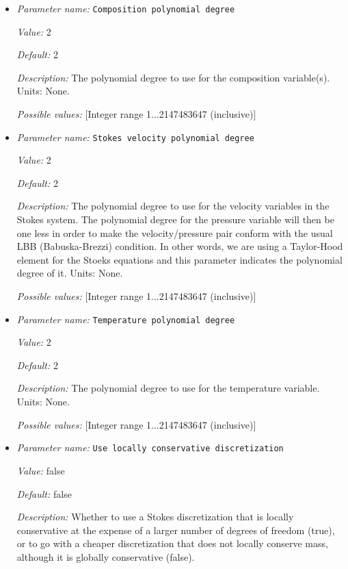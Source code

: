 \begin{itemize}
\item {\it Parameter name:} {\tt Composition polynomial degree}


{\it Value:} 2


{\it Default:} 2


{\it Description:} The polynomial degree to use for the composition variable(s). Units: None.


{\it Possible values:} [Integer range 1...2147483647 (inclusive)]
\item {\it Parameter name:} {\tt Stokes velocity polynomial degree}


{\it Value:} 2


{\it Default:} 2


{\it Description:} The polynomial degree to use for the velocity variables in the Stokes system. The polynomial degree for the pressure variable will then be one less in order to make the velocity/pressure pair conform with the usual LBB (Babuska-Brezzi) condition. In other words, we are using a Taylor-Hood element for the Stoeks equations and this parameter indicates the polynomial degree of it. Units: None.


{\it Possible values:} [Integer range 1...2147483647 (inclusive)]
\item {\it Parameter name:} {\tt Temperature polynomial degree}


{\it Value:} 2


{\it Default:} 2


{\it Description:} The polynomial degree to use for the temperature variable. Units: None.


{\it Possible values:} [Integer range 1...2147483647 (inclusive)]
\item {\it Parameter name:} {\tt Use locally conservative discretization}


{\it Value:} false


{\it Default:} false


{\it Description:} Whether to use a Stokes discretization that is locally conservative at the expense of a larger number of degrees of freedom (true), or to go with a cheaper discretization that does not locally conserve mass, although it is globally conservative (false).


\end{itemize}
